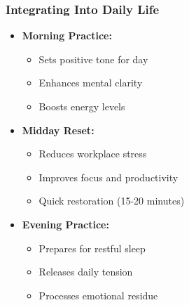 \begin{frame}[fragile]\frametitle{Integrating Into Daily Life}
    \begin{itemize}
        \item \textbf{Morning Practice:}
        \begin{itemize}
            \item Sets positive tone for day
            \item Enhances mental clarity
            \item Boosts energy levels
        \end{itemize}
        \item \textbf{Midday Reset:}
        \begin{itemize}
            \item Reduces workplace stress
            \item Improves focus and productivity
            \item Quick restoration (15-20 minutes)
        \end{itemize}
        \item \textbf{Evening Practice:}
        \begin{itemize}
            \item Prepares for restful sleep
            \item Releases daily tension
            \item Processes emotional residue
        \end{itemize}
    \end{itemize}
\end{frame}

